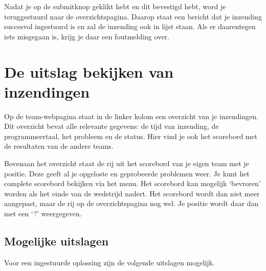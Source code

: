 Nadat je op de submitknop geklikt hebt en dit bevestigd hebt, word je
teruggestuurd naar de overzichtspagina. Daarop staat een
bericht dat je inzending succesvol ingestuurd is en zal de inzending
ook in lijst staan. Als er daarentegen iets misgegaan is, krijg je
daar een foutmelding over.

\section{De uitslag bekijken van inzendingen}

Op de team-webpagina staat in de linker kolom een overzicht van je inzendingen.
Dit overzicht bevat alle relevante gegevens: de tijd van inzending, de
programmeertaal, het probleem en de status. Hier vind je ook het scorebord
met de resultaten van de andere teams.

Bovenaan het overzicht staat de rij uit het scorebord van je eigen
team met je positie. Deze geeft al je opgeloste en geprobeerde
problemen weer. Je kunt het complete scorebord bekijken via het menu.
Het scorebord kan mogelijk `bevroren' worden als het einde van de
wedstrijd nadert. Het scorebord wordt dan niet meer aangepast, maar de
rij op de overzichtspagina nog wel. Je positie wordt daar dan met een
`?' weergegeven.

\subsection{Mogelijke uitslagen}

Voor een ingestuurde oplossing zijn de volgende uitslagen mogelijk.

